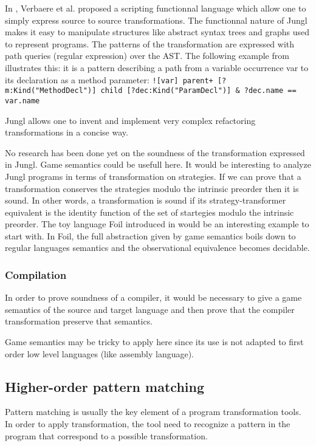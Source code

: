 \documentclass[10pt,twocolumn]{article}
\begin{document}
In \cite{jungl}, Verbaere et al. proposed a scripting functionnal language which allow one
to simply express source to source transformations. The functionnal nature of Jungl makes it easy to manipulate structures like abstract syntax trees and graphs used to represent programs.
The patterns of the transformation are expressed with path queries (regular expression) over the AST.
The following example from \cite{jungl} illustrates this: it is a pattern
describing a path from a variable occurrence var to its declaration as a method parameter:
\texttt{![var] parent+ [?m:Kind("MethodDecl")] child [?dec:Kind("ParamDecl")] \& ?dec.name == var.name}

Jungl allows one to invent and implement very complex refactoring transformations in a concise way.

No research has been done yet on the soundness of the transformation expressed in Jungl.
Game semantics could be usefull here. It would be interesting to analyze Jungl programs
in terms of transformation on strategies. If we can prove that a transformation conserves the strategies
modulo the intrinsic preorder then it is sound. In other words, a transformation is sound if its strategy-transformer equivalent is the identity function of the set of startegies modulo the intrinsic preorder.
The toy language Foil introduced in \cite{Ghica03} would be an interesting example to start with. In Foil, the full abstraction given by game semantics boils down to regular languages semantics and the observational equivalence becomes decidable.


\subsubsection{Compilation}
In order to prove soundness of a compiler, it would be necessary to give a game semantics of
the source and target language and then prove that the compiler transformation preserve that semantics.

Game semantics may be tricky to apply here since its use is not
adapted to first order low level languages (like assembly language).

\subsection{Higher-order pattern matching}

Pattern matching is usually the key element of a program
transformation tools. In order to apply transformation, the tool
need to recognize a pattern in the program that correspond to a
possible transformation.
\end{document}
